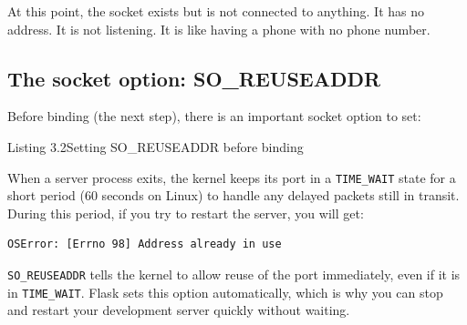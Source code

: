 \noindent{}At this point, the socket exists but is not connected to anything. It has no address. It is not listening. It is like having a phone with no phone number.

\subsection*{The socket option: SO\_REUSEADDR}\label{03-network-capability:the-socket-option-so-reuseaddr}

Before binding (the next step), there is an important socket option to set:

\begin{codeboxcap}[short]{\textcolor{accent}{Listing 3.2}\enspace Setting SO\_REUSEADDR before binding}

\begin{Shaded}
\begin{Highlighting}[]

\OperatorTok{=}

\NormalTok{)}
\end{Highlighting}
\end{Shaded}

\end{codeboxcap}

\noindent{}When a server process exits, the kernel keeps its port in a \texttt{TIME\_WAIT} state for a short period (60 seconds on Linux) to handle any delayed packets still in transit. During this period, if you try to restart the server, you will get:

\begin{outputbox}[short]
\begin{Verbatim}[fontsize=\codesize, breaklines, breakanywhere, breaksymbolleft={\tiny\textcolor{muted}{$\hookrightarrow$}}]
OSError: [Errno 98] Address already in use
\end{Verbatim}
\end{outputbox}

\noindent{}\texttt{SO\_REUSEADDR} tells the kernel to allow reuse of the port immediately, even if it is in \texttt{TIME\_WAIT}. Flask sets this option automatically, which is why you can stop and restart your development server quickly without waiting.

